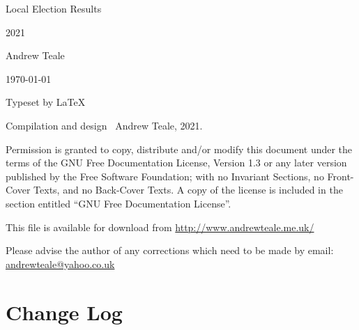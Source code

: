 \documentclass[a4paper,openany]{book}
\begin{document}

\begin{titlepage}

\begin{center}

\Huge Local Election Results

2021

\bigskip

\Large Andrew Teale

\vfill

\newcommand\versionno{0.10.1}


\today

\end{center}

\end{titlepage}


\begin{center}

\bigskip

Typeset by \LaTeX{} 

\bigskip

Compilation and design \textcopyright\ Andrew Teale, 2021.

 Permission is granted to copy, distribute and/or modify this document
 under the terms of the GNU Free Documentation License, Version 1.3
 or any later version published by the Free Software Foundation;
 with no Invariant Sections, no Front-Cover Texts, and no Back-Cover Texts.
 A copy of the license is included in the section entitled ``GNU
 Free Documentation License''.

\bigskip

This file is available for download from
\url{http://www.andrewteale.me.uk/}

\bigskip

Please advise the author of any corrections which need to be made by
email: \url{andrewteale@yahoo.co.uk}

\vfill
\end{center}

\section*{Change Log}


%
\end{document}
